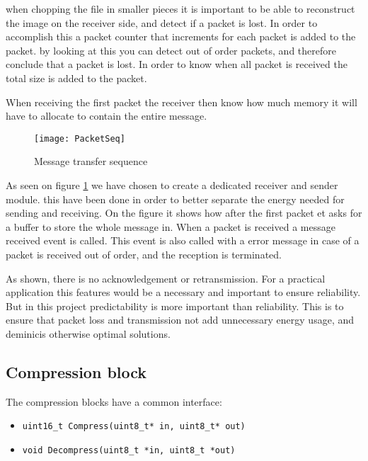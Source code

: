 when chopping the file in smaller pieces it is important to be able to reconstruct the image on the receiver side, and detect if a packet is lost. In order to accomplish this a packet counter that increments for each packet is added to the packet. by looking at this you can detect out of order packets, and therefore conclude that a packet is lost. In order to know when all packet is received the total size is added to the packet.  

When receiving the first packet the receiver then know how much memory it will have to allocate to contain the entire message. 


\begin{figure}[H]
	\centering
	\texttt{[image: PacketSeq]}
	\caption{Message transfer sequence }
	\label{fig:PacketSeq}
\end{figure}





As seen on figure \ref{fig:PacketSeq} we have chosen to create a dedicated receiver and sender module. this have been done in order to better separate the energy needed for sending and receiving. On the figure it shows how after the first packet et asks for a buffer to store the whole message in. When a packet is received a message received event is called. This event is also called with a error message in case of a packet is received out of order, and the reception is terminated. 

As shown, there is no acknowledgement or retransmission. For a practical application this features would be a necessary and important to ensure reliability. But in this project predictability is more important than reliability.  This is to ensure that packet loss and transmission not add unnecessary energy usage, and deminicis otherwise optimal solutions.  





\subsection{Compression block}
\label{subs:compression}
The compression blocks have a common interface: 

\begin{itemize}
    \item \texttt{uint16\_t Compress(uint8\_t* in, uint8\_t* out)}
    \item \texttt{void Decompress(uint8\_t *in, uint8\_t *out)}
\end{itemize}

